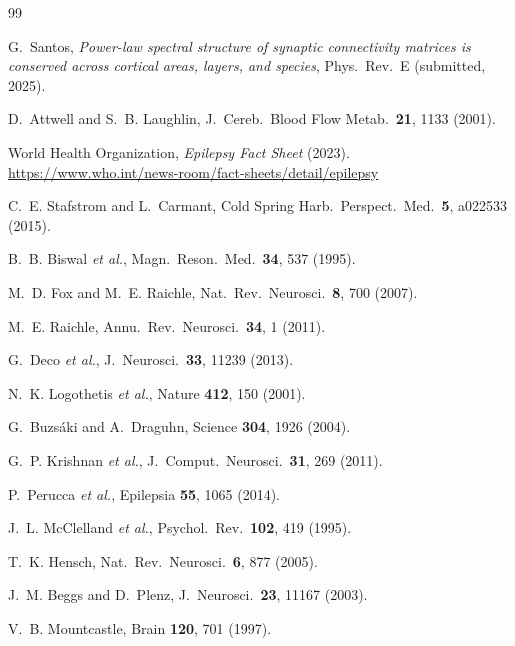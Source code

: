 \documentclass[aps,pre,twocolumn,showpacs,superscriptaddress,longbibliography]{revtex4-2}
\begin{document}
\begin{thebibliography}{99}

G.~Santos,
\emph{Power-law spectral structure of synaptic connectivity
matrices is conserved across cortical areas, layers, and species},
Phys.\ Rev.\ E (submitted, 2025).

D.~Attwell and S.~B. Laughlin,
J.\ Cereb.\ Blood Flow Metab.\ \textbf{21}, 1133 (2001).

World Health Organization,
\emph{Epilepsy Fact Sheet} (2023).
\url{https://www.who.int/news-room/fact-sheets/detail/epilepsy}

C.~E. Stafstrom and L.~Carmant,
Cold Spring Harb.\ Perspect.\ Med.\ \textbf{5}, a022533 (2015).

B.~B. Biswal \emph{et al.},
Magn.\ Reson.\ Med.\ \textbf{34}, 537 (1995).

M.~D. Fox and M.~E. Raichle,
Nat.\ Rev.\ Neurosci.\ \textbf{8}, 700 (2007).

M.~E. Raichle,
Annu.\ Rev.\ Neurosci.\ \textbf{34}, 1 (2011).

G.~Deco \emph{et al.},
J.\ Neurosci.\ \textbf{33}, 11239 (2013).

N.~K. Logothetis \emph{et al.},
Nature \textbf{412}, 150 (2001).

G.~Buzs\'aki and A.~Draguhn,
Science \textbf{304}, 1926 (2004).

G.~P. Krishnan \emph{et al.},
J.\ Comput.\ Neurosci.\ \textbf{31}, 269 (2011).

P.~Perucca \emph{et al.},
Epilepsia \textbf{55}, 1065 (2014).

J.~L. McClelland \emph{et al.},
Psychol.\ Rev.\ \textbf{102}, 419 (1995).

T.~K. Hensch,
Nat.\ Rev.\ Neurosci.\ \textbf{6}, 877 (2005).

J.~M. Beggs and D.~Plenz,
J.\ Neurosci.\ \textbf{23}, 11167 (2003).

V.~B. Mountcastle,
Brain \textbf{120}, 701 (1997).

\end{thebibliography}
\end{document}
